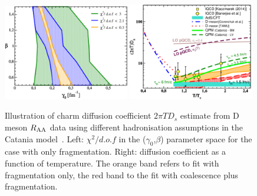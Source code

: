 \begin{figure}[!hb]
\begin{center}
\includegraphics[width=0.49\textwidth]{hf/figures/chi2_vers2.pdf}
\includegraphics[width=0.49\textwidth]{hf/figures/Ds_lQCD_CHI2_COAL-FRAGM.pdf}
\end{center}
\caption{Illustration of charm diffusion coefficient $2\pi T D_s$ estimate from D meson $R_{\rm AA}$ data using different hadronisation assumptions in the Catania model~\cite{Das:2015ana,Das:2013kea}. Left: $\chi^2/d.o.f$ in the ($\gamma_0$,$\beta$)  parameter space for the case with only fragmentation.
Right: diffusion coefficient as a function of temperature. The orange band refers to fit 
with fragmentation only, the red band to the fit with coalescence plus fragmentation.}
\label{Fig:CHI2}
\end{figure}


